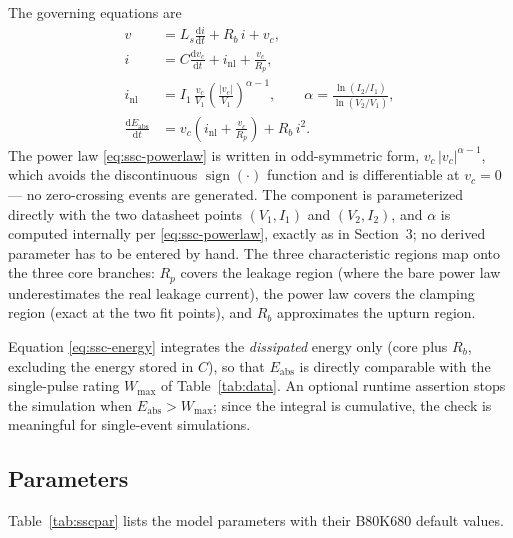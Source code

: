 \documentclass[11pt,a4paper]{article}
\begin{document}
The governing equations are
%
\begin{align}
  v &= L_s \frac{\mathrm{d}i}{\mathrm{d}t} + R_b\, i + v_c ,
  \label{eq:ssc-terminal}\\[2pt]
  i &= C \frac{\mathrm{d}v_c}{\mathrm{d}t} + i_\mathrm{nl}
       + \frac{v_c}{R_p} ,
  \label{eq:ssc-node}\\[2pt]
  i_\mathrm{nl} &= I_1 \, \frac{v_c}{V_1}
    \left( \frac{|v_c|}{V_1} \right)^{\alpha - 1},
  \qquad
  \alpha = \frac{\ln (I_2/I_1)}{\ln (V_2/V_1)} ,
  \label{eq:ssc-powerlaw}\\[2pt]
  \frac{\mathrm{d}E_\mathrm{abs}}{\mathrm{d}t}
    &= v_c \left( i_\mathrm{nl} + \frac{v_c}{R_p} \right) + R_b\, i^2 .
  \label{eq:ssc-energy}
\end{align}
%
The power law \eqref{eq:ssc-powerlaw} is written in odd-symmetric form,
$v_c \, |v_c|^{\alpha-1}$, which avoids the discontinuous
$\operatorname{sign}(\cdot)$ function and is differentiable at
$v_c = 0$ --- no zero-crossing events are generated. The component is
parameterized directly with the two datasheet points $(V_1, I_1)$ and
$(V_2, I_2)$, and $\alpha$ is computed internally per
\eqref{eq:ssc-powerlaw}, exactly as in Section~3; no derived parameter has
to be entered by hand. The three characteristic regions map onto the three
core branches: $R_p$ covers the leakage region (where the bare power law
underestimates the real leakage current), the power law covers the clamping
region (exact at the two fit points), and $R_b$ approximates the upturn
region.

Equation \eqref{eq:ssc-energy} integrates the \emph{dissipated} energy only
(core plus $R_b$, excluding the energy stored in $C$), so that
$E_\mathrm{abs}$ is directly comparable with the single-pulse rating
$W_\mathrm{max}$ of Table~\ref{tab:data}. An optional runtime assertion
stops the simulation when $E_\mathrm{abs} > W_\mathrm{max}$; since the
integral is cumulative, the check is meaningful for single-event
simulations.

\subsection{Parameters}

Table~\ref{tab:sscpar} lists the model parameters with their B80K680
default values.
\end{document}
